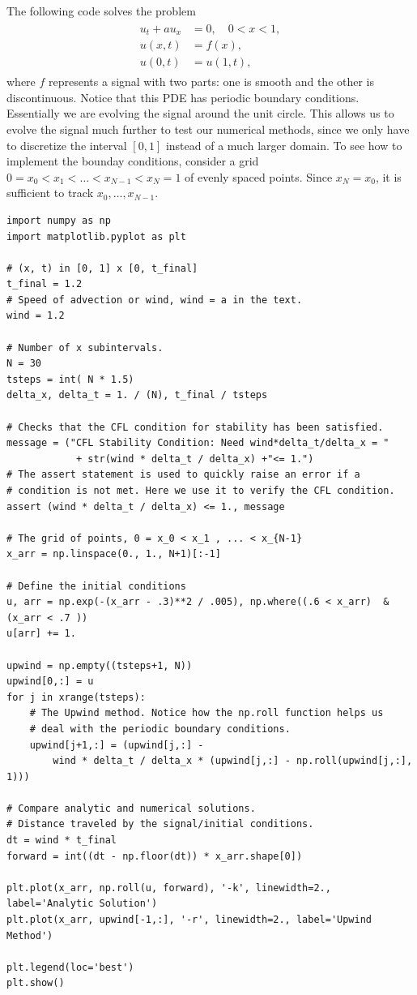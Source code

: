The following code solves the problem
\begin{align}
\begin{split}
	u_t +a u_x &= 0, \quad 0 < x < 1, \\
	u(x,t) &= f(x),\\
	u(0,t) &= u(1,t),
\end{split}\label{eqn:fv_exercise}
\end{align}
where $f$ represents a signal with two parts: one is smooth and the other is discontinuous.
Notice that this PDE has periodic boundary conditions.
Essentially we are evolving the signal around the unit circle.
This allows us to evolve the signal much further to test our numerical methods, since we only have to discretize the interval $[0,1]$ instead of a much larger domain.
To see how to implement the bounday conditions, consider a grid $0 = x_0< x_1< \ldots< x_{N-1}< x_N = 1$ of evenly spaced points.
Since $x_N = x_0$, it is sufficient to track $x_0, \ldots , x_{N-1}$.

\begin{lstlisting}
import numpy as np
import matplotlib.pyplot as plt

# (x, t) in [0, 1] x [0, t_final]
t_final = 1.2
# Speed of advection or wind, wind = a in the text.
wind = 1.2

# Number of x subintervals.
N = 30
tsteps = int( N * 1.5)
delta_x, delta_t = 1. / (N), t_final / tsteps

# Checks that the CFL condition for stability has been satisfied.
message = ("CFL Stability Condition: Need wind*delta_t/delta_x = "
            + str(wind * delta_t / delta_x) +"<= 1.")
# The assert statement is used to quickly raise an error if a
# condition is not met. Here we use it to verify the CFL condition.
assert (wind * delta_t / delta_x) <= 1., message

# The grid of points, 0 = x_0 < x_1 , ... < x_{N-1}
x_arr = np.linspace(0., 1., N+1)[:-1]

# Define the initial conditions
u, arr = np.exp(-(x_arr - .3)**2 / .005), np.where((.6 < x_arr)  &  (x_arr < .7 ))
u[arr] += 1.

upwind = np.empty((tsteps+1, N))
upwind[0,:] = u
for j in xrange(tsteps):
    # The Upwind method. Notice how the np.roll function helps us 
    # deal with the periodic boundary conditions.
    upwind[j+1,:] = (upwind[j,:] -
        wind * delta_t / delta_x * (upwind[j,:] - np.roll(upwind[j,:], 1)))

# Compare analytic and numerical solutions.
# Distance traveled by the signal/initial conditions.
dt = wind * t_final
forward = int((dt - np.floor(dt)) * x_arr.shape[0])

plt.plot(x_arr, np.roll(u, forward), '-k', linewidth=2., label='Analytic Solution')
plt.plot(x_arr, upwind[-1,:], '-r', linewidth=2., label='Upwind Method')

plt.legend(loc='best')
plt.show()
\end{lstlisting}

